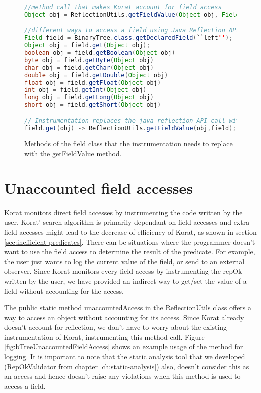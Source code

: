 \begin{figure}
\centering
\begin{lstlisting}[language=Java]
//method call that makes Korat account for field access
Object obj = ReflectionUtils.getFieldValue(Object obj, Field field);

//different ways to access a field using Java Reflection API
Field field = BinaryTree.class.getDeclaredField(``left'');
Object obj = field.get(Object obj);
boolean obj = field.getBoolean(Object obj)
byte obj = field.getByte(Object obj)
char obj = field.getChar(Object obj)
double obj = field.getDouble(Object obj)
float obj = field.getFloat(Object obj)
int obj = field.getInt(Object obj)
long obj = field.getLong(Object obj)
short obj = field.getShort(Object obj)

// Instrumentation replaces the java reflection API call with our API call
field.get(obj) -> ReflectionUtils.getFieldValue(obj,field);
\end{lstlisting}
\caption{Methods of the field class that the instrumentation needs to replace with the getFieldValue method.}
\label{fig:fieldClassInstrumentationMethods}
\end{figure}

\section{Unaccounted field accesses}
\label{ch:unaccounted-field-accesses}
Korat monitors direct field accesses by instrumenting the code written by the user. Korat’ search algorithm is primarily dependant on field accesses and extra field accesses might lead to the decrease of efficiency of Korat, as shown in section \ref{sec:inefficient-predicates}. There can be situations where the programmer doesn’t want to use the field access to determine the result of the predicate. For example, the user just wants to log the current value of the field, or send to an external observer. Since Korat monitors every field access by instrumenting the repOk written by the user, we have provided an indirect way to get/set the value of a field without accounting for the access.

\para
The public static method unaccountedAccess in the ReflectionUtils class offers a way to access an object without accounting for its access. Since Korat already doesn’t account for reflection, we don’t have to worry about the existing instrumentation of Korat, instrumenting this method call. Figure \ref{fig:bTreeUnaccountedFieldAccess} shows an example usage of the method for logging. It is important to note that the static analysis tool that we developed (RepOkValidator from chapter \ref{ch:static-analysis}) also, doesn’t consider this as an access and hence doesn’t raise any violations when this method is used to access a field.


